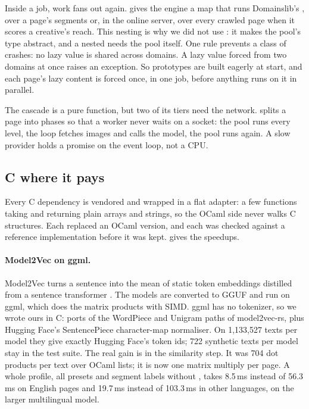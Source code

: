 Inside a job, work fans out again.  gives the engine a map that runs Domainslib's , over a page's segments or, in the online server, over every crawled page when it scores a creative's reach. This nesting is why we did not use : it makes the pool's type abstract, and a nested  needs the pool itself. One rule prevents a class of crashes: no lazy value is shared across domains. A lazy value forced from two domains at once raises an exception. So prototypes are built eagerly at start, and each page's lazy content is forced once, in one job, before anything runs on it in parallel.

The cascade is a pure function, but two of its tiers need the network.  splits a page into phases so that a worker never waits on a socket: the pool runs every level, the loop fetches images and calls the model, the pool runs again. A slow provider holds a promise on the event loop, not a CPU.

\subsection{C where it pays}\label{sec:impl-c}

Every C dependency is vendored and wrapped in a flat adapter: a few functions taking and returning plain arrays and strings, so the OCaml side never walks C structures. Each replaced an OCaml version, and each was checked against a reference implementation before it was kept.  gives the speedups.

\paragraph{Model2Vec on ggml.} Model2Vec turns a sentence into the mean of static token embeddings distilled from a sentence transformer \citep{tulkens2024model2vec}. The models are converted to GGUF and run on ggml, which does the matrix products with SIMD. ggml has no tokenizer, so we wrote ours in C: ports of the WordPiece and Unigram paths of model2vec-rs, plus Hugging Face's SentencePiece character-map normaliser. On 1,133,527 texts per model they give exactly Hugging Face's token ids; 722 synthetic texts per model stay in the test suite. The real gain is in the similarity step. It was 704 dot products per text over OCaml lists; it is now one matrix multiply per page. A whole profile, all presets and segment labels without , takes 8.5\,ms instead of 56.3\,ms on English pages and 19.7\,ms instead of 103.3\,ms in other languages, on the larger multilingual model.

